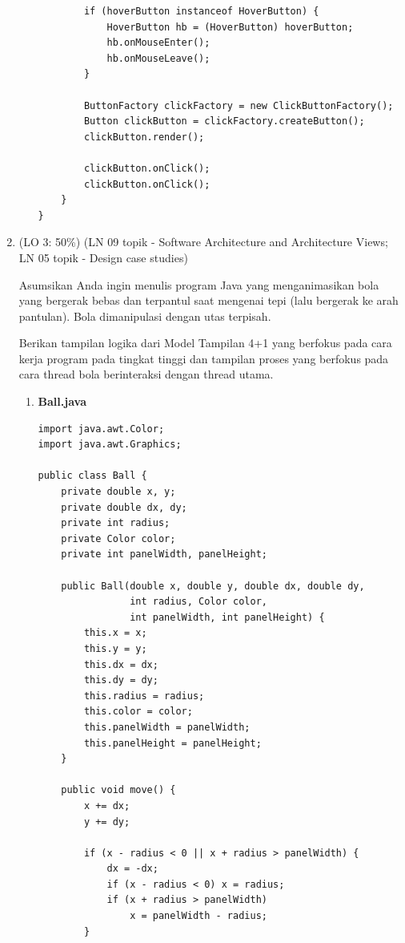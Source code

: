 \documentclass[a4paper]{article}
\begin{document}
\begin{enumerate}[itemsep=1em]
\begin{enumerate}[itemsep=1em]
\begin{verbatim}
        if (hoverButton instanceof HoverButton) {
            HoverButton hb = (HoverButton) hoverButton;
            hb.onMouseEnter();
            hb.onMouseLeave();
        }
        
        ButtonFactory clickFactory = new ClickButtonFactory();
        Button clickButton = clickFactory.createButton();
        clickButton.render();
        
        clickButton.onClick();
        clickButton.onClick();
    }
}
    \end{verbatim}
  \end{enumerate}

  \item (LO 3: 50\%) (LN 09 topik - Software Architecture and Architecture Views; LN 05 topik - Design case studies)
  
  Asumsikan Anda ingin menulis program Java yang menganimasikan bola yang bergerak bebas dan terpantul saat mengenai tepi (lalu bergerak ke arah pantulan). Bola dimanipulasi dengan utas terpisah.

  \vspace{1em}

  Berikan tampilan logika dari Model Tampilan 4+1 yang berfokus pada cara kerja program pada tingkat tinggi dan tampilan proses yang berfokus pada cara thread bola berinteraksi dengan thread utama.

  \vspace{1em}

  \begin{enumerate}[itemsep=1em]
    \item \textbf{Ball.java}
    \begin{verbatim}
import java.awt.Color;
import java.awt.Graphics;

public class Ball {
    private double x, y;
    private double dx, dy;
    private int radius;
    private Color color;
    private int panelWidth, panelHeight;

    public Ball(double x, double y, double dx, double dy, 
                int radius, Color color, 
                int panelWidth, int panelHeight) {
        this.x = x;
        this.y = y;
        this.dx = dx;
        this.dy = dy;
        this.radius = radius;
        this.color = color;
        this.panelWidth = panelWidth;
        this.panelHeight = panelHeight;
    }

    public void move() {
        x += dx;
        y += dy;

        if (x - radius < 0 || x + radius > panelWidth) {
            dx = -dx;
            if (x - radius < 0) x = radius;
            if (x + radius > panelWidth) 
                x = panelWidth - radius;
        }


\end{verbatim}
\end{enumerate}
\end{enumerate}
\end{document}
